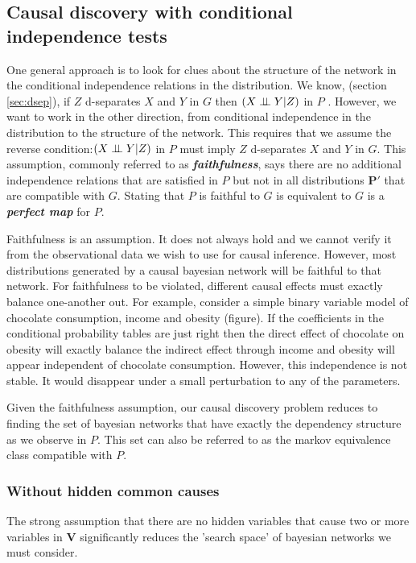 \documentclass[11pt,a4paper]{article}
\begin{document}
\subsection{Causal discovery with conditional independence tests}
One general approach is to look for clues about the structure of the network in the conditional independence relations in the distribution. We know, (section \ref{sec:dsep}), if $Z$ d-separates $X$ and $Y$ in $G$ then $(X \perp\!\!\!\perp Y|Z)$ in $P$ . However, we want to work in the other direction, from conditional independence in the distribution to the structure of the network. This requires that we assume the reverse condition:$(X \perp\!\!\!\perp Y|Z)$ in $P$ must imply $Z$ d-separates $X$ and $Y$ in $G$. This assumption, commonly referred to as  \textbf{\textit{faithfulness}}, says there are no additional independence relations that are satisfied in $P$ but not in all distributions $\boldsymbol{P'}$ that are compatible with $G$. Stating that $P$ is faithful to $G$ is equivalent to $G$ is a \textbf{\textit{perfect map}} for $P$.

Faithfulness is an assumption. It does not always hold and we cannot verify it from the observational data we wish to use for causal inference. However, most distributions generated by a causal bayesian network will be faithful to that network. For faithfulness to be violated, different causal effects must exactly balance one-another out. For example, consider a simple binary variable model of chocolate consumption, income and obesity (figure). If the coefficients in the conditional probability tables are just right then the direct effect of chocolate on obesity will exactly balance the indirect effect through income and obesity will appear independent of chocolate consumption. However, this independence is not stable. It would disappear under a small perturbation to any of the parameters.  

Given the faithfulness assumption, our causal discovery problem reduces to finding the set of bayesian networks that have exactly the dependency structure as we observe in $P$. This set can also be referred to as the markov equivalence class compatible with $P$.

\subsubsection{Without hidden common causes}
The strong assumption that there are no hidden variables that cause two or more variables in $\boldsymbol{V}$ significantly reduces the 'search space' of bayesian networks we must consider. 
\end{document}
